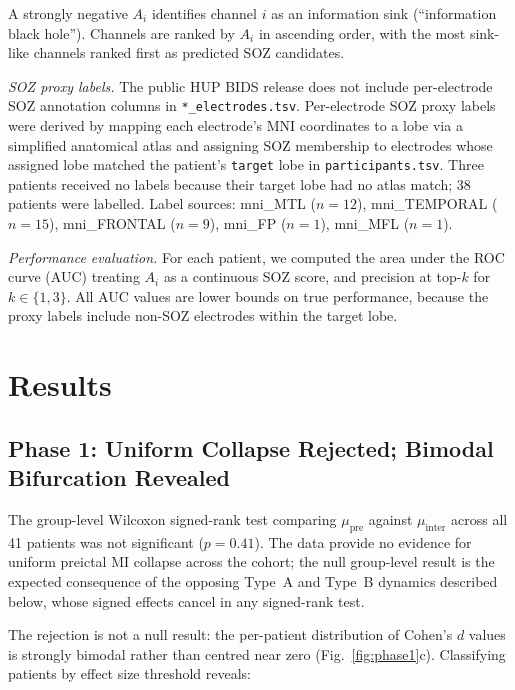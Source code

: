 \documentclass[final,5p,times,twocolumn]{elsarticle}
\begin{document}
A strongly negative $A_i$ identifies channel $i$ as an information sink
(``information black hole'').
%
Channels are ranked by $A_i$ in ascending order, with the most
sink-like channels ranked first as predicted SOZ candidates.

\textit{SOZ proxy labels.}
The public HUP BIDS release does not include per-electrode SOZ
annotation columns in \texttt{*\_electrodes.tsv}.
%
Per-electrode SOZ proxy labels were derived by mapping each electrode's
MNI coordinates to a lobe via a simplified anatomical atlas and
assigning SOZ membership to electrodes whose assigned lobe matched the
patient's \texttt{target} lobe in \texttt{participants.tsv}.
%
Three patients received no labels because their target lobe had no
atlas match; 38 patients were labelled.
%
Label sources: mni\_MTL ($n = 12$), mni\_TEMPORAL ($n = 15$),
mni\_FRONTAL ($n = 9$), mni\_FP ($n = 1$), mni\_MFL ($n = 1$).

\textit{Performance evaluation.}
For each patient, we computed the area under the ROC curve (AUC)
treating $A_i$ as a continuous SOZ score, and precision at top-$k$
for $k \in \{1, 3\}$.
%
All AUC values are lower bounds on true performance, because the proxy
labels include non-SOZ electrodes within the target lobe.

\section{Results}
\label{sec:results}

\subsection{Phase 1: Uniform Collapse Rejected; Bimodal Bifurcation Revealed}

The group-level Wilcoxon signed-rank test comparing $\mu_{\text{pre}}$
against $\mu_{\text{inter}}$ across all 41 patients was not significant
($p = 0.41$).
%
The data provide no evidence for uniform preictal MI collapse across
the cohort; the null group-level result is the expected consequence of
the opposing Type~A and Type~B dynamics described below, whose signed
effects cancel in any signed-rank test.

The rejection is not a null result: the per-patient distribution of
Cohen's $d$ values is strongly bimodal rather than centred near zero
(Fig.~\ref{fig:phase1}c).
%
Classifying patients by effect size threshold reveals:
\end{document}
